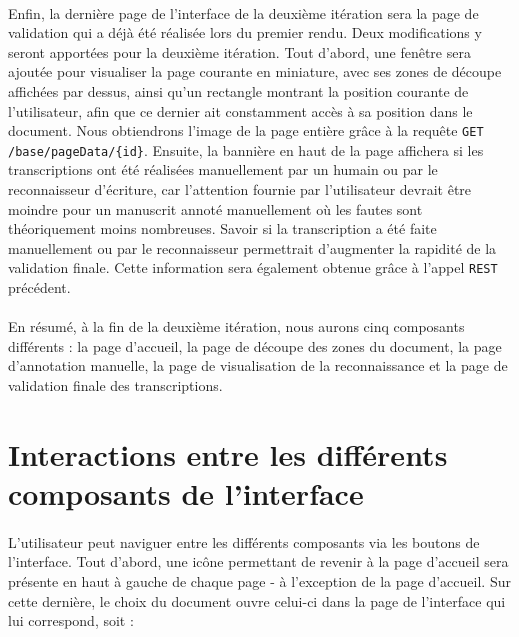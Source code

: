 \paragraph{}
Enfin, la dernière page de l’interface de la deuxième itération sera la page de validation qui a déjà été réalisée lors du premier rendu. Deux modifications y seront apportées pour la deuxième itération.
\newline{}
Tout d'abord, une fenêtre sera ajoutée pour visualiser la page courante en miniature, avec ses zones de découpe affichées par dessus, ainsi qu’un rectangle montrant la position courante de l’utilisateur, afin que ce dernier ait constamment accès à sa position dans le document. Nous obtiendrons l'image de la page entière grâce à la requête \texttt{GET} \texttt{/base/pageData/\{id\}}.
\newline{}
Ensuite, la bannière en haut de la page affichera si les transcriptions ont été réalisées manuellement par un humain ou par le reconnaisseur d'écriture, car l'attention fournie par l'utilisateur devrait être moindre pour un manuscrit annoté manuellement où les fautes sont théoriquement moins nombreuses. Savoir si la transcription a été faite manuellement ou par le reconnaisseur permettrait d'augmenter la rapidité de la validation finale. Cette information sera également obtenue grâce à l'appel \texttt{REST} précédent.

\paragraph{}
En résumé, à la fin de la deuxième itération, nous aurons cinq composants différents : la page d’accueil, la page de découpe des zones du document, la page d’annotation manuelle, la page de visualisation de la reconnaissance et la page de validation finale des transcriptions.

\section{Interactions entre les différents composants de l'interface}

\paragraph{}
L’utilisateur peut naviguer entre les différents composants via les boutons de l’interface.
\newline{}
Tout d’abord, une icône permettant de revenir à la page d’accueil sera présente en haut à gauche de chaque page - à l’exception de la page d’accueil. Sur cette dernière, le choix du document ouvre celui-ci dans la page de l’interface qui lui correspond, soit :

